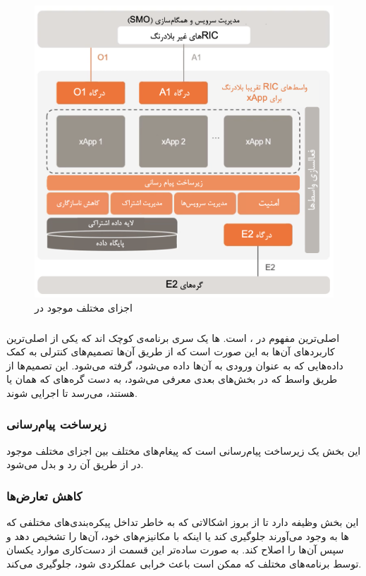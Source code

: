 \documentclass{CSICC}
\begin{document}
\begin{figure}[H]
	\includegraphics[width=\columnwidth]{Images/nrt-ric0.png}
	\centering
	\caption{اجزای مختلف موجود در
		}
	\label{fig:nrt-ric0}
\end{figure}

\subsubsection{}
اصلی‌ترین مفهوم در 
، 
است. 
ها
یک سری برنامه‌ی کوچک اند که یکی از اصلی‌ترین کاربردهای آن‌ها به این صورت است که از طریق آن‌ها تصمیم‌های کنترلی به کمک داده‌هایی که به عنوان ورودی به آن‌ها داده می‌شود، گرفته می‌شود. این تصمیم‌ها از طریق واسط
که در بخش‌‌های بعدی معرفی می‌شود، به دست گره‌های 
که همان
 یا
هستند، می‌رسد تا اجرایی شوند.


\subsubsection{زیرساخت پیام‌رسانی}
این بخش یک زیرساخت پیام‌رسانی است که پیغام‌های مختلف بین اجزای مختلف موجود در
از طریق آن رد و بدل می‌شود. 

\subsubsection{کاهش تعارض‌ها}
این بخش وظیفه دارد تا از بروز اشکالاتی که به خاطر تداخل پیکره‌بندی‌های مختلفی که 
ها
به وجود می‌آورند جلوگیری کند یا اینکه با مکانیزم‌های خود، آن‌ها را تشخیص دهد و سپس آن‌ها را اصلاح کند. به صورت ساده‌تر این قسمت از دست‌کاری موارد یکسان توسط برنامه‌های مختلف که ممکن است باعث خرابی عملکردی شود، جلوگیری می‌کند.
\end{document}

